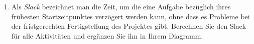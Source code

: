 \documentclass{lehramt-informatik-aufgabe}
\begin{document}
\begin{enumerate}
\begin{liAntwort}
\begin{center}
\end{center}
\end{liAntwort}


\item Als \emph{Slack} bezeichnet man die Zeit, um die eine Aufgabe
bezüglich ihres frühesten Startzeitpunktes verzögert werden kann, ohne
dass es Probleme bei der fristgerechten Fertigstellung des Projektes
gibt. Berechnen Sie den Slack für alle Aktivitäten und ergänzen Sie ihn
in Ihrem Diagramm.

\begin{liAntwort}


\end{liAntwort}
\end{enumerate}
\end{document}
